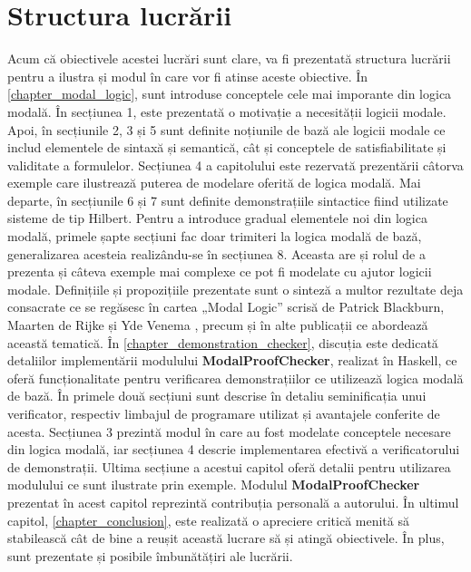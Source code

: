 \documentclass[12pt, openany]{book}
\newcommand{\mysectionreference}[1]{\autoref{#1}}
\begin{document}
        \section{Structura lucrării} %
        \label{section_structure}
            \par{}
                Acum că obiectivele acestei lucrări sunt clare, va fi prezentată structura lucrării pentru a ilustra 
                și modul în care vor fi atinse aceste obiective. În \mysectionreference{chapter_modal_logic}, sunt 
                introduse conceptele cele mai imporante din logica modală. În secțiunea 1, este prezentată o 
                motivație a necesității logicii modale. Apoi, în secțiunile 2, 3 și 5 sunt definite noțiunile 
                de bază ale logicii modale ce includ elementele de sintaxă și semantică, cât și conceptele de 
                satisfiabilitate și validitate a formulelor. Secțiunea 4 a capitolului este rezervată prezentării 
                câtorva exemple care ilustrează puterea de modelare oferită de logica modală. Mai departe, în secțiunile 
                6 și 7 sunt definite demonstrațiile sintactice fiind utilizate sisteme de tip Hilbert. Pentru a 
                introduce gradual elementele noi din logica modală, primele șapte secțiuni fac doar trimiteri la logica 
                modală de bază, generalizarea acesteia realizându-se în secțiunea 8. Aceasta are și rolul de a 
                prezenta și câteva exemple mai complexe ce pot fi modelate cu ajutor logicii modale. Definițiile și 
                propozițiile prezentate sunt o sinteză a multor rezultate deja consacrate ce se regăsesc în cartea 
                „Modal Logic” scrisă de Patrick Blackburn, Maarten de Rijke și Yde Venema \cite{modal_logic}, precum și 
                în alte publicații ce abordează această tematică. În \mysectionreference{chapter_demonstration_checker}, 
                discuția este dedicată detaliilor implementării modulului \textbf{ModalProofChecker}, realizat în 
                Haskell, ce oferă funcționalitate pentru verificarea demonstrațiilor ce utilizează logica modală de 
                bază. În primele două secțiuni sunt descrise în detaliu seminificația unui verificator, respectiv limbajul 
                de programare utilizat și avantajele conferite de acesta. Secțiunea 3 prezintă modul în care au fost 
                modelate conceptele necesare din logica modală, iar secțiunea 4 descrie implementarea efectivă a 
                verificatorului de demonstrații. Ultima secțiune a acestui capitol oferă detalii pentru utilizarea 
                modulului ce sunt ilustrate prin exemple. Modulul \textbf{ModalProofChecker} prezentat în acest capitol 
                reprezintă contribuția personală a autorului. În ultimul capitol, 
                \mysectionreference{chapter_conclusion}, este realizată o apreciere critică menită să stabilească cât de 
                bine a reușit această lucrare să și atingă obiectivele. În plus, sunt prezentate și posibile 
                îmbunătățiri ale lucrării.
            
\end{document}
